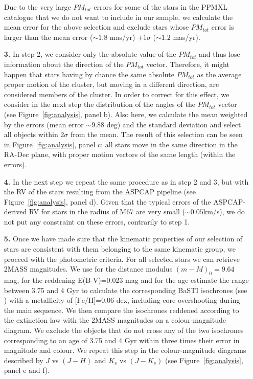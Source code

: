 \documentclass[a4paper,fleqn,usenatbib]{mnras}
\begin{document}
\begin{itemize}
	Due to the very large $PM_{tot}$ errors for some of the stars in the PPMXL catalogue that we do not want to include in our sample, we calculate the mean error for the above selection and exclude stars whose $PM_{tot}$ error is larger than the mean error ($\sim1.8$ mas/yr) $+1\sigma$ ($\sim1.2$ mas/yr).
	\item [\textbf{3.}] In step 2, we consider only the absolute value of the $PM_{tot}$ and thus lose information about the direction of the $PM_{tot}$ vector. 	Therefore, it might happen that stars having by chance the same absolute $PM_{tot}$ as the average proper motion of the cluster, but moving in a different direction, are considered members of the cluster. In order to correct for this effect, we consider in the next step the distribution of the angles of the $PM_{tot}$ vector (see Figure~\ref{fig:analysis}, panel b). Also here, we calculate the mean weighted by the errors (mean error $\sim9.88$ deg) and the standard deviation and select all objects within $2\sigma$ from the mean. 
	The result of this selection can be seen in Figure~\ref{fig:analysis}, panel c: all stars move in the same direction in the RA-Dec plane, with proper motion vectors of the same length (within the errors).
	\item [\textbf{4.}] In the next step we repeat the same procedure as in step 2 and 3, but with the RV of the stars resulting from  the ASPCAP pipeline (see Figure~\ref{fig:analysis}, panel d). Given that the typical errors of the ASPCAP-derived RV for stars in the radius of M67 are very small ($\sim0.05$km/s), we do not put any constraint on these errors, contrarily to step 1.
	\item [\textbf{5.}] Once we have made sure that the kinematic properties of our selection of stars are consistent with them belonging to the same kinematic group, we proceed with the photometric criteria. For all selected stars we can retrieve 2MASS magnitudes. We use for the distance modulus $(m-M)_0=9.64$ mag, for the reddening E(B-V)=0.023 mag and for the age estimate the range between 3.75 and 4 Gyr \citep[from][]{bellini2010} to calculate the corresponding BaSTI isochrones (see \citealt{pietrinferni2004}) with a metallicity of $\text{[Fe/H]=0.06}$ dex, including core overshooting during the main sequence. We then compare the isochrones reddened according to the \citet{cardelli1989} extinction law with the 2MASS magnitudes on a colour-magnitude diagram. 
	We exclude the objects that do not cross any of the two isochrones corresponding to an age of 3.75 and 4 Gyr within three times their error in magnitude and colour. We repeat this step in the colour-magnitude diagrams described by $J$ vs $(J-H)$ and $K_s$ vs $(J-K_s)$ (see Figure~\ref{fig:analysis}, panel e and f). 
	

\end{itemize}
\end{document}
